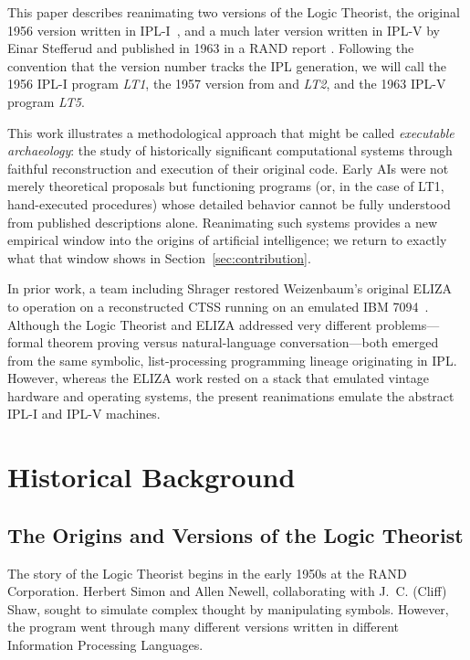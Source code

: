 \documentclass[journal]{IEEEtran}
\begin{document}
This paper describes reanimating two versions of the Logic Theorist,
the original 1956 version written in IPL-I~\cite{LT1956b}, and a much 
later version written in IPL-V by Einar Stefferud and published in 1963
in a RAND report \cite{stefferud1963lt}.  Following the convention
that the version number tracks the IPL generation, we will call the
1956 IPL-I program \emph{LT1}, the 1957 version
from \cite{LT1957} and \cite{newellshaw1957} \emph{LT2},
and the 1963 IPL-V program \emph{LT5}.

This work illustrates a methodological approach that might be called
\emph{executable archaeology}: the study of historically significant
computational systems through faithful reconstruction and execution of
their original code. Early AIs were not merely theoretical proposals
but functioning programs (or, in the case of LT1, hand-executed
procedures) whose detailed behavior cannot be fully understood from
published descriptions alone. Reanimating such systems provides a new
empirical window into the origins of artificial intelligence; we
return to exactly what that window shows in
Section~\ref{sec:contribution}.

In prior work, a team including Shrager restored
Weizenbaum's original ELIZA to operation on a reconstructed CTSS
running on an emulated IBM 7094~\cite{lane2025eliza}. Although the
Logic Theorist and ELIZA addressed very different problems---formal
theorem proving versus natural-language conversation---both emerged
from the same symbolic, list-processing programming lineage
originating in IPL. However, whereas the ELIZA work rested on a stack
that emulated vintage hardware and operating systems, the present
reanimations emulate the abstract IPL-I and IPL-V machines.

\section{Historical Background}
\label{sec:history}

\subsection{The Origins and Versions of the Logic Theorist}

The story of the Logic Theorist begins in the early 1950s at the RAND
Corporation. Herbert Simon and Allen Newell, collaborating with
J.~C. (Cliff) Shaw, sought to simulate complex thought by manipulating
symbols. However, the program went through many different versions
written in different Information Processing Languages.
\end{document}

